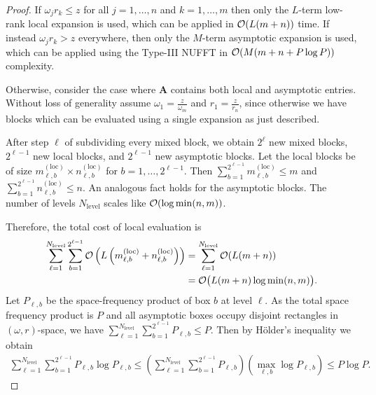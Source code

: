 \begin{proof}
    If $\omega_j r_k \leq z$ for all $j=1,\dots,n$ and $k=1,\dots,m$ then only
    the $L$-term low-rank local expansion is used, which can be applied in
    $\mathcal{O}(L(m + n))$ time. If instead $\omega_j r_k > z$ everywhere, then only
    the $M$-term asymptotic expansion is used, which can be applied using the
    Type-III NUFFT in $\mathcal{O}(M(m + n + P\log P))$ complexity.

    Otherwise, consider the case where $\bm{A}$ contains both local and
    asymptotic entries. Without loss of generality assume $\omega_1 =
    \frac{z}{\omega_m}$ and $r_1 = \frac{z}{r_n}$, since otherwise we have
    blocks which can be evaluated using a single expansion as just described.

    After step $\ell$ of subdividing every mixed block, we obtain $2^{\ell}$ new
    mixed blocks, $2^{\ell-1}$ new local blocks, and $2^{\ell-1}$ new asymptotic
    blocks. Let the local blocks be of size $m_{\ell,b}^{(\text{loc})} \times
    n_{\ell,b}^{(\text{loc})}$ for $b = 1,\dots,2^{\ell-1}$. Then
    $\sum_{b=1}^{2^{\ell-1}} m_{\ell,b}^{(\text{loc})} \leq m$ and
    $\sum_{b=1}^{2^{\ell-1}} n_{\ell,b}^{(\text{loc})} \leq n$. An analogous
    fact holds for the asymptotic blocks. The number of levels
    $N_{\text{level}}$ scales like $\mathcal{O}(\log\min(n,m))$. 
    
    Therefore, the total cost of local evaluation is 
    \begin{align}
        \sum_{\ell=1}^{N_{\text{level}}} \sum_{b=1}^{2^{\ell-1}} \mathcal{O}\left(L\left(m_{\ell,b}^{(\text{loc})} + n_{\ell,b}^{(\text{loc})}\right)\right)
        &= \sum_{\ell=1}^{N_{\text{level}}} \mathcal{O}(L(m + n)) \\
        &= \mathcal{O}\big(L (m + n) \log \min(n,m)\big).
    \end{align}
    Let $P_{\ell,b}$ be the space-frequency product of box $b$ at level $\ell$.
    As the total space frequency product is $P$ and all asymptotic boxes occupy
    disjoint rectangles in $(\omega, r)$-space, we have
    $\sum_{\ell=1}^{N_{\text{level}}} \sum_{b=1}^{2^{\ell-1}} P_{\ell,b} \leq
    P$. Then by H\"older's inequality we obtain 
    \begin{align} 
        \sum_{\ell=1}^{N_{\text{level}}} \sum_{b=1}^{2^{\ell-1}} P_{\ell,b} \log P_{\ell,b}
        \leq \left( \sum_{\ell=1}^{N_{\text{level}}} \sum_{b=1}^{2^{\ell-1}} P_{\ell,b} \right) \left(\max_{\ell,b} \log P_{\ell,b} \right) 
        \leq P \log P.
    \end{align}


\end{proof}
